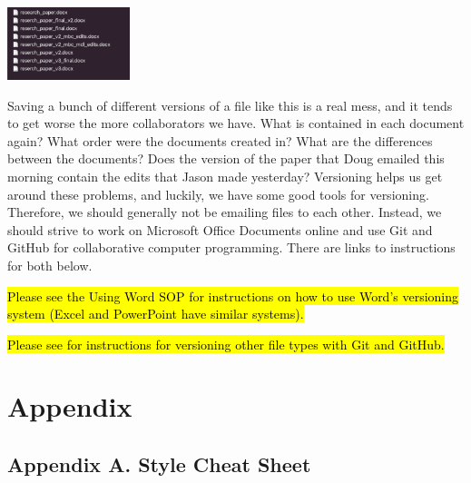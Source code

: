 \documentclass[
  letterpaper,
  DIV=11,
  numbers=noendperiod]{scrreprt}
\begin{document}
\begin{center}
\includegraphics[width=1.41in,height=\textheight]{chapters/style_guide/../../graphics/bad_folder.png}
\end{center}

Saving a bunch of different versions of a file like this is a real mess,
and it tends to get worse the more collaborators we have. What is
contained in each document again? What order were the documents created
in? What are the differences between the documents? Does the version of
the paper that Doug emailed this morning contain the edits that Jason
made yesterday? Versioning helps us get around these problems, and
luckily, we have some good tools for versioning. Therefore, we should
generally not be emailing files to each other. Instead, we should strive
to work on Microsoft Office Documents online and use Git and GitHub for
collaborative computer programming. There are links to instructions for
both below.

\hl{Please see the Using Word SOP for instructions on how to use Word's
versioning system (Excel and PowerPoint have similar systems).}

\hl{Please see for instructions for versioning other file types with Git
and GitHub.}

\chapter{Appendix}\label{sec-appendix}

\section{Appendix A. Style Cheat
Sheet}\label{appendix-a.-style-cheat-sheet}
\end{document}
